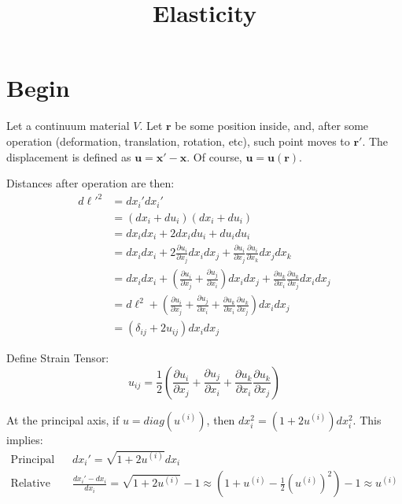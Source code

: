 \documentclass[a4paper, 12pt]{report}
\begin{document}
\title{Elasticity}
\maketitle

\section{Begin}
Let a continuum material $V$. Let $\mathbf r$ be some position inside, and, after some operation (deformation, translation, rotation, etc), such point moves to $\mathbf r'$. The displacement is defined as $\mathbf u = \mathbf x' - \mathbf x$. Of course, $\mathbf u = \mathbf u(\mathbf r)$.

Distances after operation are then:
\begin{equation}
\begin{array}{ll}
d\ell'^2 &= dx_i' dx_i' \\
&= \displaystyle  (dx_i + du_i)(dx_i + du_i) \\
&= \displaystyle dx_i dx_i + 2 dx_i du_i + du_i du_i \\
&= \displaystyle  dx_i dx_i + 2 \frac{\partial u_i}{\partial x_j} dx_i dx_j + \frac{\partial u_i}{\partial x_j}\frac{\partial u_i}{\partial x_k} dx_j dx_k \\
&= \displaystyle  dx_i dx_i + \left(\frac{\partial u_i}{\partial x_j} + \frac{\partial u_j}{\partial x_i}\right) dx_i dx_j + \frac{\partial u_k}{\partial x_i}\frac{\partial u_k}{\partial x_j} dx_i dx_j \\
&= \displaystyle  d\ell^2 + \left(\frac{\partial u_i}{\partial x_j} + \frac{\partial u_j}{\partial x_i} + \frac{\partial u_k}{\partial x_i}\frac{\partial u_k}{\partial x_j}\right) dx_i dx_j \\
&= \displaystyle  (\delta_{ij} + 2u_{ij}) dx_i dx_j\
\end{array}
\end{equation}


Define Strain Tensor:
\begin{equation}
u_{ij} = \frac{1}{2}\left(\frac{\partial u_i}{\partial x_j} + \frac{\partial u_j}{\partial x_i} + \frac{\partial u_k}{\partial x_i}\frac{\partial u_k}{\partial x_j}\right)
\end{equation}

At the principal axis, if $u = diag(u^{(i)})$, then $dx_i^2 = (1 + 2u^{(i)})dx_i^2$. This implies:
\begin{equation}
\begin{array}{ll}
\text{Principal Axis:}& dx_i' = \sqrt{1 + 2u^{(i)}} dx_i \\
\text{Relative Extension:}& \frac{dx_i' - dx_i}{dx_i} = \sqrt{1 + 2u^{(i)}} - 1\approx \left(1 + u^{(i)} - \frac{1}{2}(u^{(i)})^2\right) - 1\approx u^{(i)} \\
\end{array}
\end{equation}
\end{document}
